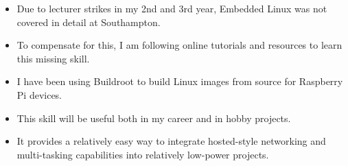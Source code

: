 {
  {\begin{itemize}
    \item Due to lecturer strikes in my 2nd and 3rd year, Embedded Linux was not covered in detail at Southampton.
    \item To compensate for this, I am following online tutorials and resources to learn this missing skill.
    \item I have been using Buildroot to build Linux images from source for Raspberry Pi devices.
    \item This skill will be useful both in my career and in hobby projects.
    \item It provides a relatively easy way to integrate hosted-style networking and multi-tasking capabilities into relatively low-power projects. 
  \end{itemize}
  }
}

